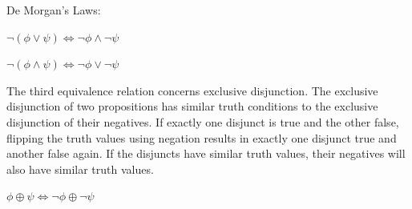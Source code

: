 \documentclass[oneside]{report}
\theoremstyle{definition}
\theoremstyle{definition}
\theoremstyle{definition}
\theoremstyle{remark}
\begin{document}
De Morgan's Laws:

\(\lnot (\phi \lor \psi) \Leftrightarrow \lnot \phi \land \lnot \psi\)

\(\lnot (\phi \land \psi) \Leftrightarrow \lnot \phi \lor \lnot \psi\)

The third equivalence relation concerns exclusive disjunction. The
exclusive disjunction of two propositions has similar truth conditions
to the exclusive disjunction of their negatives. If exactly one disjunct
is true and the other false, flipping the truth values using negation
results in exactly one disjunct true and another false again. If the
disjuncts have similar truth values, their negatives will also have
similar truth values.

\(\phi \oplus \psi \Leftrightarrow \lnot \phi \oplus \lnot \psi\)
\end{document}
